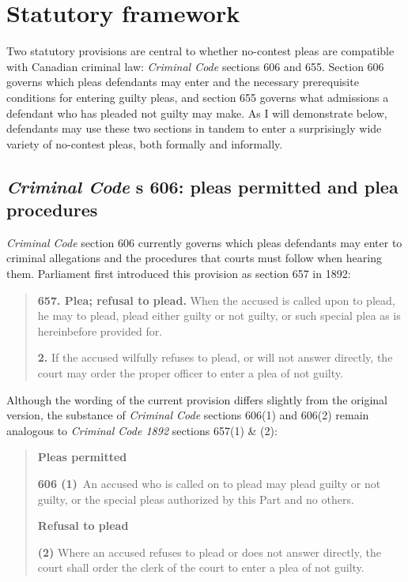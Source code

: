 \section{Statutory framework}

Two statutory provisions are central to whether no-contest pleas are compatible with Canadian criminal law: \textit{Criminal Code} sections 606 and 655. Section 606 governs which pleas defendants may enter and the necessary prerequisite conditions for entering guilty pleas, and section 655 governs what admissions a defendant who has pleaded not guilty may make. As I will demonstrate below, defendants may use these two sections in tandem to enter a surprisingly wide variety of no-contest pleas, both formally and informally.

\subsection{\textit{Criminal Code} s 606: pleas permitted and plea procedures}

\textit{Criminal Code} section 606 currently governs which pleas defendants may enter to criminal allegations and the procedures that courts must follow when hearing them. Parliament first introduced this provision as section 657 in 1892:

\begin{quote}
\textbf{657. Plea; refusal to plead.} When the accused is called upon to plead, he may to plead, plead either guilty or not guilty, or such special plea as is hereinbefore provided for.

\textbf{2.} If the accused wilfully refuses to plead, or will not answer directly, the court may order the proper officer to enter a plea of not guilty. 
\end{quote}

Although the wording of the current provision differs slightly from the original version, the substance of \textit{Criminal Code} sections 606(1) and 606(2) remain analogous to \textit{Criminal Code 1892} sections 657(1) \& (2): 

\begin{quote}
    \onehalfspacing
    \textbf{Pleas permitted}
    
    \textbf{606 (1)} An accused who is called on to plead may plead guilty or not guilty, or the special pleas authorized by this Part and no others.\medskip

    \textbf{Refusal to plead}
    
    \textbf{(2)} Where an accused refuses to plead or does not answer directly, the court shall order the clerk of the court to enter a plea of not guilty.
    
\end{quote}

